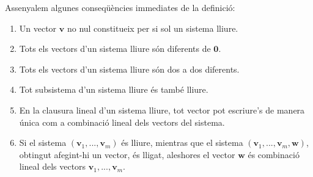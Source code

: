 \begin{teorema}
Assenyalem algunes conseqüències immediates de la definició:

\begin{enumerate}
\item Un vector $\mathbf{v}$ no nul constitueix per si sol un sistema
lliure.

\item Tots els vectors d’un sistema lliure són diferents de $\mathbf{0}$.

\item Tots els vectors d’un sistema lliure són dos a dos diferents.

\item Tot subsistema d’un sistema lliure és també lliure.

\item En la clausura lineal d’un sistema lliure, tot vector pot
escriure's de manera única com a combinació lineal dels vectors
del sistema.

\item Si el sistema $(\mathbf{v}_{1},...,\mathbf{v}_{m})$ és lliure, mientras
que el sistema $(\mathbf{v}_{1},...,\mathbf{v}_{m},\mathbf{w})$, obtingut afegint-hi un vector, és lligat, aleshores el vector $\mathbf{w}$ és
combinació lineal dels vectors $\mathbf{v}_{1},...,\mathbf{v}_{m}$.
\end{enumerate}

\end{teorema}
